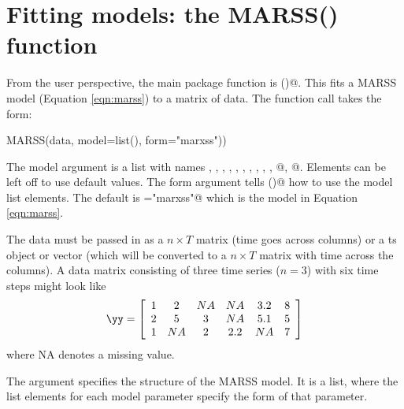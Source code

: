 \chapter{Fitting models: the MARSS() function}\label{chap:MARSS}

From the user perspective, the main package function is \verb@MARSS()@.  This fits a MARSS model (Equation \ref{eqn:marss}) to a matrix of data. The function call takes the form:
\begin{Schunk}
\begin{Sinput}
MARSS(data, model=list(), form="marxss")) 
\end{Sinput}
\end{Schunk}
The model argument is a list with names \verb@B@, \verb@U@, \verb@C@, \verb@c@, \verb@Q@, \verb@Z@, \verb@A@, \verb@D@, \verb@d@, \verb@R@, @, @.  Elements can be left off to use default values.  The form argument tells \verb@MARSS()@ how to use the model list elements.  The default is \verb@form="marxss"@ which is the model in Equation \ref{eqn:marss}.

The data must be passed in as a $n \times T$ matrix (time goes across columns) or a ts object or vector (which will be converted to a $n \times T$ matrix with time across the columns). A data matrix consisting of three time series ($n=3$) with six time steps might look like
\begin{equation*}
\yy = \left[ \begin{array}{ccccccc}
    1 & 2 & NA & NA & 3.2 & 8\\
    2 & 5 &  3 & NA & 5.1 & 5\\
    1 & NA & 2 & 2.2 & NA & 7\end{array} \right]
\end{equation*}
where NA denotes a missing value.

The argument \verb@model@ specifies the structure of the MARSS model.  It is a list, where the list elements for each model parameter specify the form of that parameter.  

